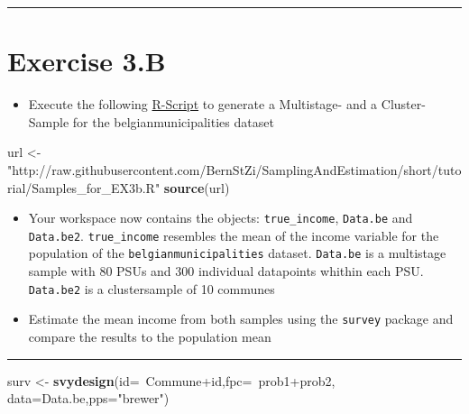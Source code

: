 \documentclass[]{article}
\newenvironment{Shaded}{\begin{snugshade}}{\end{snugshade}}
\newcommand{\KeywordTok}[1]{\textcolor[rgb]{0.13,0.29,0.53}{\textbf{{#1}}}}
\newcommand{\DataTypeTok}[1]{\textcolor[rgb]{0.13,0.29,0.53}{{#1}}}
\newcommand{\StringTok}[1]{\textcolor[rgb]{0.31,0.60,0.02}{{#1}}}
\newcommand{\NormalTok}[1]{{#1}}
\providecommand{\tightlist}{%
  \setlength{\itemsep}{0pt}\setlength{\parskip}{0pt}}
\begin{document}
\begin{center}\rule{0.5\linewidth}{\linethickness}\end{center}

\section{Exercise 3.B}\label{exercise-3.b}

\begin{itemize}
\tightlist
\item
  Execute the following
  \href{https://raw.githubusercontent.com/BernStZi/SamplingAndEstimation/short/tutorial/Samples_for_EX3b.R}{R-Script}
  to generate a Multistage- and a Cluster- Sample for the
  belgianmunicipalities dataset
\end{itemize}

\begin{Shaded}
\begin{Highlighting}[]
\NormalTok{url <-}\StringTok{ "http://raw.githubusercontent.com/BernStZi/SamplingAndEstimation/short/tutorial/Samples_for_EX3b.R"}
\KeywordTok{source}\NormalTok{(url)}
\end{Highlighting}
\end{Shaded}

\begin{itemize}
\tightlist
\item
  Your workspace now contains the objects: \texttt{true\_income},
  \texttt{Data.be} and \texttt{Data.be2}. \texttt{true\_income}
  resembles the mean of the income variable for the population of the
  \texttt{belgianmunicipalities} dataset. \texttt{Data.be} is a
  multistage sample with 80 PSUs and 300 individual datapoints whithin
  each PSU. \texttt{Data.be2} is a clustersample of 10 communes
\item
  Estimate the mean income from both samples using the \texttt{survey}
  package and compare the results to the population mean
\end{itemize}

\begin{center}\rule{0.5\linewidth}{\linethickness}\end{center}

\begin{Shaded}
\begin{Highlighting}[]
\NormalTok{surv <-}\StringTok{ }\KeywordTok{svydesign}\NormalTok{(}\DataTypeTok{id=}\NormalTok{~Commune+id,}\DataTypeTok{fpc=}\NormalTok{~prob1+prob2, }
                  \DataTypeTok{data=}\NormalTok{Data.be,}\DataTypeTok{pps=}\StringTok{"brewer"}\NormalTok{)}
\end{Highlighting}
\end{Shaded}
\end{document}
